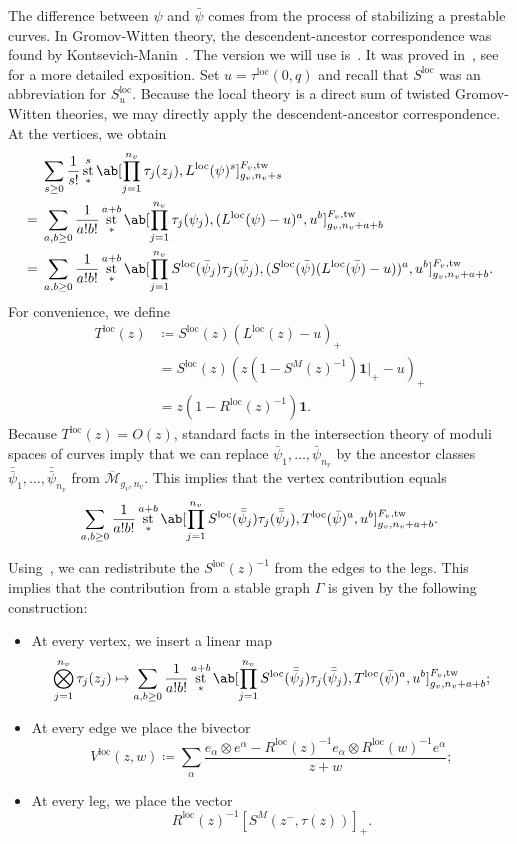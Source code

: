 \documentclass[10pt]{amsart}
\theoremstyle{definition}
\theoremstyle{remark}
\theoremstyle{plain}
\theoremstyle{definition}
\theoremstyle{remark}
\newcommand{\msc}[1]{\mathscr{#1}}
\newcommand{\mr}[1]{\mathrm{#1}}
\newcommand{\ol}[1]{\overline{#1}}
\newcommand{\1}{\mathbf{1}}
\newcommand{\2}{\mathbf{2}}
\newcommand{\3}{\mathbf{3}}
\newcommand{\loc}{\mr{loc}}
\newcommand{\tw}{\mr{tw}}
\DeclareMathOperator{\st}{st}
\numberwithin{equation}{section}
\begin{document}
The difference between $\psi$ and $\bar{\psi}$ comes from the process of stabilizing a prestable curves. In Gromov-Witten theory, the descendent-ancestor correspondence was found by Kontsevich-Manin~\cite{descancestor}. The version we will use is~\cite[Theorem 5.1]{virasorofanotoric}. It was proved in~\cite[Appendix 2]{qrr}, see~\cite[\S 1.5]{coatesthesis} for a more detailed exposition. Set $u = \tau^{\loc}(0,q)$ and recall that $S^{\loc}$ was an abbreviation for $S^{\loc}_u$. Because the local theory is a direct sum of twisted Gromov-Witten theories, we may directly apply the descendent-ancestor correspondence. At the vertices, we obtain
\begin{align*}
    &\sum_{s \geq 0} \frac{1}{s!} \st^s_*\ab[\prod_{j=1}^{n_v} \tau_j(z_j), L^{\loc}(\psi)^s]_{g_v, n_v+s}^{F_v, \tw} \\
    ={}& \sum_{a,b \geq 0} \frac{1}{a!b!} \st^{a+b}_*\ab[\prod_{j=1}^{n_v} \tau_j(\psi_j), ( L^{\loc}(\psi) - u )^a, u^b]_{g_v, n_v+a+b}^{F_v, \tw} \\
    ={}& \sum_{a,b \geq 0} \frac{1}{a!b!} \st^{a+b}_*\ab[\prod_{j=1}^{n_v} S^{\loc}(\bar{\psi}_j) \tau_j(\bar{\psi}_j),( S^{\loc}(\bar{\psi}) ( L^{\loc}(\bar{\psi}) - u ) )^a, u^b]_{g_v, n_v+a+b}^{F_v, \tw} .
\end{align*}
For convenience, we define
\begin{align*}
    T^{\loc}(z) &\coloneqq S^{\loc}(z) (L^{\loc}(z) - u)_+ \\
    &= S^{\loc}(z) (z(1-S^M(z)^{-1})\1|_+ - u)_+ \\
    &= z(1-R^{\loc}(z)^{-1})\1.
\end{align*}
Because $T^{\loc}(z) = O(z)$, standard facts in the intersection theory of moduli spaces of curves imply that we can replace $\bar{\psi}_1, \ldots, \bar{\psi}_{n_v}$ by the ancestor classes $\bar{\bar{\psi}}_1, \ldots, \bar{\bar{\psi}}_{n_v}$ from $\ol{\msc{M}}_{g_v, n_v}$. This implies that the vertex contribution equals
\[
    \sum_{a,b \geq 0} \frac{1}{a!b!} \st^{a+b}_*\ab[\prod_{j=1}^{n_v} S^{\loc}(\bar{\bar{\psi}}_j) \tau_j(\bar{\bar{\psi}}_j),  T^{\loc}(\bar{\psi})^a, u^b]_{g_v, n_v+a+b}^{F_v, \tw} .
\]

Using~, we can redistribute the $S^{\loc}(z)^{-1}$ from the edges to the legs. This implies that the contribution from a stable graph $\Gamma$ is given by the following construction:
\begin{itemize}
    \item At every vertex, we insert a linear map
        \[ \bigotimes_{j=1}^{n_v} \tau_j(z_j) \mapsto \sum_{a,b \geq 0} \frac{1}{a!b!} \st^{a+b}_*\ab[\prod_{j=1}^{n_v} S^{\loc}(\bar{\bar{\psi}}_j) \tau_j(\bar{\bar{\psi}}_j),  T^{\loc}(\bar{\psi})^a, u^b]_{g_v, n_v+a+b}^{F_v, \tw}; \]
    \item At every edge we place the bivector
        \[ V^{\loc}(z,w) \coloneqq \sum_{\alpha} \frac{e_{\alpha}\otimes e^{\alpha} - R^{\loc}(z)^{-1} e_{\alpha} \otimes R^{\loc}(w)^{-1} e^{\alpha}}{z+w}; \]
    \item At every leg, we place the vector
        \[ R^{\loc}(z)^{-1} [S^M(z^-, \tau(z))]_+. \]
\end{itemize}
\end{document}
